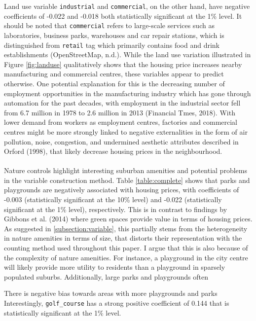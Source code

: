 \documentclass{article}
\begin{document}
Land use variable \texttt{industrial} and \texttt{commercial}, on the other hand, have negative coefficients of -0.022 and -0.018 both statistically significant at the 1\% level. It should be noted that \texttt{commercial} refers to large-scale services such as laboratories, business parks, warehouses and car repair stations, which is distinguished from \texttt{retail} tag which primarily contains food and drink establishments (OpenStreetMap, n.d.). While the land use variation illustrated in Figure \ref{fig:landuse} qualitatively shows that the housing price increases nearby manufacturing and commercial centres, these variables appear to predict otherwise. One potential explanation for this is the decreasing number of employment opportunities in the manufacturing industry which has gone through automation for the past decades, with employment in the industrial sector fell from 6.7 million in 1978 to 2.6 million in 2013 (Financial Tmes, 2018). With lower demand from workers as employment centres, factories and commercial centres might be more strongly linked to negative externalities in the form of air pollution, noise, congestion, and undermined aesthetic attributes described in Orford (1998), that likely decrease housing prices in the neighbourhood.\\\\
Nature controls highlight interesting suburban amenities and potential problems in the variable construction method. Table \ref{table:complete} shows that parks and playgrounds are negatively associated with housing prices, with coefficients of -0.003 (statistically significant at the 10\% level) and -0.022 (statistically significant at the 1\% level), respectively. This is in contrast to findings by Gibbons et al. (2014) where green spaces provide value in terms of housing prices. As suggested in \ref{subsection:variable}, this partially stems from the heterogeneity in nature amenities in terms of size, that distorts their representation with the counting method used throughout this paper. I argue that this is also because of the complexity of nature amenities. For instance, a playground in the city centre will likely provide more utility to residents than a playground in sparsely populated suburbs. Additionally, large parks and playgrounds often 

There is negative bias towards areas with more playgrounds and parks 
Interestingly, \texttt{golf\_course} has a strong positive coefficient of 0.144 that is statistically significant at the 1\% level. 
\end{document}

